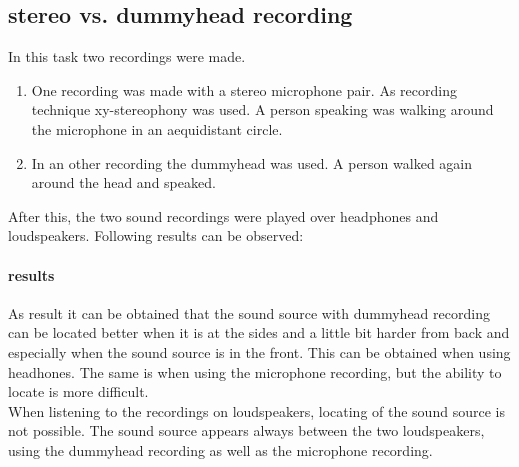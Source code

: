 \documentclass{article}
\begin{document}
\subsection{stereo vs. dummyhead recording}
In this task two recordings were made. 
\begin{enumerate}
\item One recording was made with a stereo microphone pair. As recording technique xy-stereophony was used. A person speaking was walking around the microphone in an aequidistant circle.
\item In an other recording the dummyhead was used. A person walked again around the head and speaked.
\end{enumerate}
After this, the two sound recordings were played over headphones and loudspeakers. Following results can be observed:
\paragraph{results\\}
As result it can be obtained that the sound source with dummyhead recording can be located better when it is at the sides and a little bit harder from back and especially when the sound source is in the front. This can be obtained when using headhones. The same is when using the microphone recording, but the ability to locate is more difficult.\\
When listening to the recordings on loudspeakers, locating of the sound source is not possible. The sound source appears always between the two loudspeakers, using the dummyhead recording as well as the microphone recording.
\end{document}
